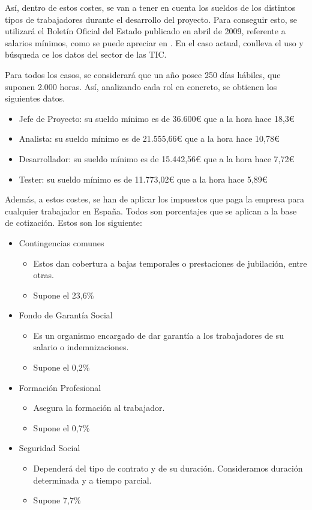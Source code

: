 Así, dentro de estos costes, se van a tener en cuenta los sueldos de los distintos tipos de trabajadores durante el desarrollo del proyecto. Para conseguir esto, se utilizará el Boletín Oficial del Estado publicado en abril de 2009, referente a salarios mínimos, como se puede apreciar en . En el caso actual, conlleva el uso y búsqueda ce los datos del sector de las TIC.

Para todos los casos, se considerará que un año posee 250 días hábiles, que suponen 2.000 horas. Así, analizando cada rol en concreto, se obtienen los siguientes datos.

\begin{itemize}
    \item Jefe de Proyecto: su sueldo mínimo es de 36.600€ que a la hora hace 18,3€
    \item Analista: su sueldo mínimo es de 21.555,66€ que a la hora hace 10,78€
    \item Desarrollador: su sueldo mínimo es de 15.442,56€ que a la hora hace 7,72€
    \item Tester: su sueldo mínimo es de 11.773,02€ que a la hora hace 5,89€
\end{itemize}

Además, a estos costes, se han de aplicar los impuestos que paga la empresa para cualquier trabajador en España. Todos son porcentajes que se aplican a la base de cotización. Estos son los siguiente:

\begin{itemize}
    \item Contingencias comunes
    \begin{itemize}
        \item Estos dan cobertura a bajas temporales o prestaciones de jubilación, entre otras.
        \item Supone el 23,6\%
    \end{itemize}
    \item Fondo de Garantía Social
    \begin{itemize}
        \item Es un organismo encargado de dar garantía a los trabajadores de su salario o indemnizaciones.
        \item Supone el 0,2\%
    \end{itemize}
    \item Formación Profesional
    \begin{itemize}
        \item Asegura la formación al trabajador.
        \item Supone el 0,7\%
    \end{itemize}
    \item Seguridad Social
    \begin{itemize}
        \item Dependerá del tipo de contrato y de su duración. Consideramos duración determinada y a tiempo parcial.
        \item Supone 7,7\%
    \end{itemize}
\end{itemize}

